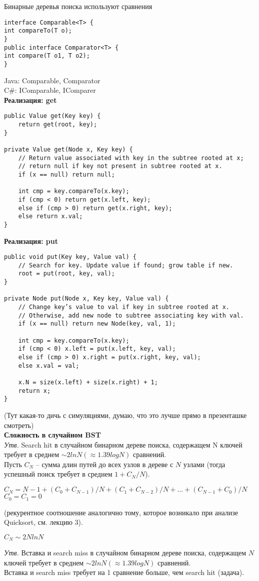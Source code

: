 Бинарные деревья поиска используют сравнения
\begin{verbatim}
interface Comparable<T> {
int compareTo(T o);
}
public interface Comparator<T> {
int compare(T o1, T o2);
}
\end{verbatim}
\noindent Java: Comparable, Comparator \\
C\#: IComparable, IComparer\\
{\bf Реализация: get}
\begin{verbatim}
public Value get(Key key) {
    return get(root, key);
}

private Value get(Node x, Key key) {
    // Return value associated with key in the subtree rooted at x;
    // return null if key not present in subtree rooted at x.
    if (x == null) return null;
    
    int cmp = key.compareTo(x.key);
    if (cmp < 0) return get(x.left, key);
    else if (cmp > 0) return get(x.right, key);
    else return x.val;
}
\end{verbatim}
{\bf Реализация: put}
\begin{verbatim}
public void put(Key key, Value val) {
    // Search for key. Update value if found; grow table if new.
    root = put(root, key, val);
}

private Node put(Node x, Key key, Value val) {
    // Change key’s value to val if key in subtree rooted at x.
    // Otherwise, add new node to subtree associating key with val.
    if (x == null) return new Node(key, val, 1);
    
    int cmp = key.compareTo(x.key);
    if (cmp < 0) x.left = put(x.left, key, val);
    else if (cmp > 0) x.right = put(x.right, key, val);
    else x.val = val;
    
    x.N = size(x.left) + size(x.right) + 1;
    return x;
}
\end{verbatim}
(Тут какая-то дичь с симуляциями, думаю, что это лучше прямо в презенташке смотреть)\\
{\bf Сложность в случайном BST}\\
\textit{Утв.} Search hit в случайном бинарном дереве поиска,
содержащем N ключей требует в среднем $\sim 2 ln N (\approx 1.39 log N)$ сравнений.\\
Пусть $C_N$ – сумма длин путей до всех узлов в дереве с $N$ узлами (тогда успешный поиск требует в среднем $1 + C_N /N$).
\begin{center}
$C_N = N-1+(C_0+C_{N-1})/N+(C_1+C_{N-2})/N+. . .+(C_{N-1}+C_0)/N$\\
$C_0 = C_1 = 0$
\end{center}
(рекурентное соотношение аналогично тому, которое возникало при анализе Quicksort, см. лекцию 3).
\vspace{2mm}
\begin{center}
$C_N \sim 2N ln N$
\end{center}
\vspace{3mm}
\textit{Утв.} Вставка и search miss в случайном бинарном дереве
поиска, содержащем $N$ ключей требует в среднем $\sim 2 ln N (\approx 1.39 log N)$ сравнений.\\
Вставка и search miss требует на 1 сравнение больше, чем
search hit (задача).

